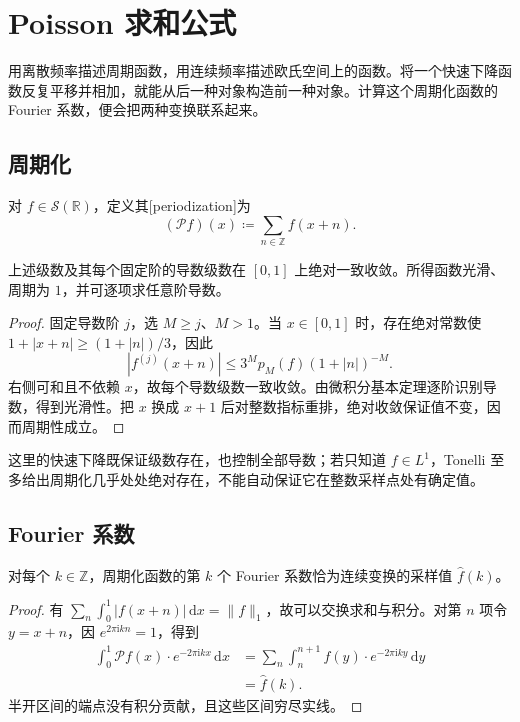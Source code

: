 \section{Poisson 求和公式}
\label{b2:sec:0601}

用离散频率描述周期函数，用连续频率描述欧氏空间上的函数。将一个快速下降函数反复平移并相加，就能从后一种对象构造前一种对象。计算这个周期化函数的 Fourier 系数，便会把两种变换联系起来。

\subsection{周期化}
\label{b2:subsec:060101}

\begin{definition}\label{b2:def:06-periodization}
对 \(f\in\mathcal S(\mathbb R)\)，定义其[periodization]为
\[
 (\mathcal Pf)(x)\coloneqq\sum_{n\in\mathbb Z}f(x+n).
\]
\end{definition}

\begin{proposition}\label{b2:prop:06-periodization-smooth}
上述级数及其每个固定阶的导数级数在 \([0,1]\) 上绝对一致收敛。所得函数光滑、周期为 \(1\)，并可逐项求任意阶导数。
\end{proposition}
\begin{proof}
固定导数阶 \(j\)，选 \(M\geq j\)、\(M>1\)。当 \(x\in[0,1]\) 时，存在绝对常数使 \(1+|x+n|\geq(1+|n|)/3\)，因此
\[
 |f^{(j)}(x+n)|\leq3^M p_M(f)(1+|n|)^{-M}.
\]
右侧可和且不依赖 \(x\)，故每个导数级数一致收敛。由微积分基本定理逐阶识别导数，得到光滑性。把 \(x\) 换成 \(x+1\) 后对整数指标重排，绝对收敛保证值不变，因而周期性成立。
\end{proof}

这里的快速下降既保证级数存在，也控制全部导数；若只知道 \(f\in L^1\)，Tonelli 至多给出周期化几乎处处绝对存在，不能自动保证它在整数采样点处有确定值。

\subsection{Fourier 系数}
\label{b2:subsec:060102}

\begin{proposition}\label{b2:prop:06-periodic-coefficients}
对每个 \(k\in\mathbb Z\)，周期化函数的第 \(k\) 个 Fourier 系数恰为连续变换的采样值 \(\widehat f(k)\)。
\end{proposition}
\begin{proof}
有 \(\sum_n\int_0^1|f(x+n)|\,\mathrm{d}x=\|f\|_1\)，故可以交换求和与积分。对第 \(n\) 项令 \(y=x+n\)，因 \(e^{2\pi\mathrm{i}kn}=1\)，得到
\[
 \begin{aligned}
 \int_0^1\mathcal Pf(x)\cdot e^{-2\pi\mathrm{i}kx}\,\mathrm{d}x
 &=\sum_n\int_n^{n+1}f(y)\cdot e^{-2\pi\mathrm{i}ky}\,\mathrm{d}y\\
 &=\widehat f(k).
 \end{aligned}
\]
半开区间的端点没有积分贡献，且这些区间穷尽实线。
\end{proof}

